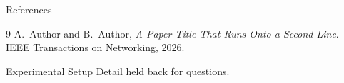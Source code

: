 \documentclass[aspectratio=169, 10pt]{beamer}
\begin{document}
\begin{frame}[allowframebreaks]{References}
	\begin{thebibliography}{9}
		A.~Author and B.~Author,
		\newblock \emph{A Paper Title That Runs Onto a Second Line}.
		\newblock IEEE Transactions on Networking, 2026.
	\end{thebibliography}
\end{frame}


\appendix

\begin{frame}{Experimental Setup}
	Detail held back for questions.
\end{frame}
\end{document}
